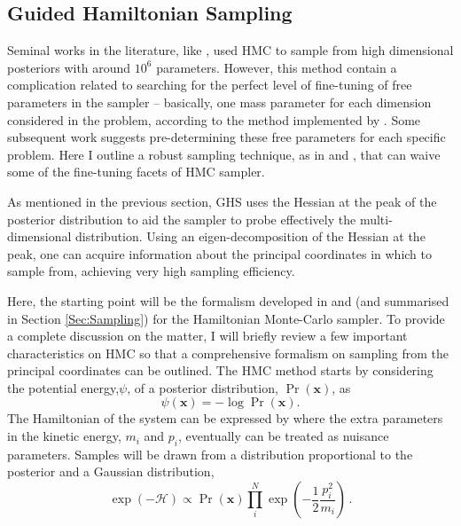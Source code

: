\subsection{Guided Hamiltonian Sampling}\label{Sec:BPL:GHS}
Seminal works in the literature, like \cite{Hanson2001,Taylor2008}, used HMC to sample from high dimensional posteriors with around $10^6$ parameters. However, this method contain a complication related to searching for the perfect level of fine-tuning of free parameters in the sampler -- basically, one mass parameter for each dimension considered in the problem, according to the method implemented by \cite{Taylor2008}. Some subsequent work suggests pre-determining these free parameters for each specific problem. Here I outline a robust sampling technique, as in \cite{SreeThesis} and \cite{2013-GuidedHamiltonian}, that can waive some of the fine-tuning facets of HMC sampler.

\qquad As mentioned in the previous section, GHS uses the Hessian at the peak of the posterior distribution to aid the sampler to probe effectively the multi-dimensional distribution. Using an eigen-decomposition of the Hessian at the peak, one can acquire information about the principal coordinates in which to sample from, achieving very high sampling efficiency.

\qquad Here, the starting point will be the formalism developed in \cite{Taylor2008} and \cite{2013-GuidedHamiltonian} (and summarised in Section \ref{Sec:Sampling}) for the Hamiltonian Monte-Carlo sampler. To provide a complete discussion on the matter, I will briefly review a few important characteristics on HMC so that a comprehensive formalism on sampling from the principal coordinates can be outlined. The HMC method starts by considering the potential energy,$\psi$, of a posterior distribution, $\Pr(\bm{x})$, as
\begin{equation}
\label{eqn::ch1_log_post}
\psi(\mathbf{x})=-\log\Pr(\mathbf{x}).
\end{equation}
The Hamiltonian of the system can be expressed by
where the extra parameters in the kinetic energy, $m_i$ and $p_i$, eventually can  be treated as nuisance parameters. Samples will be drawn from a distribution proportional to the posterior and a Gaussian distribution,
\begin{equation}
\label{EQ:BPL:HMC_ExpH}
\exp(-\mathcal{H})\propto \Pr(\bm{x})\prod_i^N\exp\left(-\frac{1}{2}\frac{p_i^2}{m_i}\right)\, .
\end{equation}

